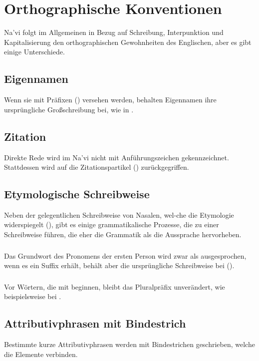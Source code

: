 \section{Orthographische Konventionen}
\noindent Na'vi folgt im Allgemeinen in Bezug auf Schreibung, Interpunktion und Kapitalisierung den orthographischen Gewohnheiten des Englischen, aber es gibt einige Unterschiede.

\subsection{Eigennamen} Wenn sie mit Präfixen () versehen werden, behalten Eigennamen ihre ursprüngliche Großschreibung bei, wie in .

\subsection{Zitation} Direkte Rede wird im Na'vi nicht mit Anführungszeichen gekennzeichnet. Stattdessen wird auf die Zitationspartikel  () zurückgegriffen.

\subsection{Etymologische Schreibweise} Neben der gelegentlichen Schreibweise von Nasalen, wel-che die Etymologie widerspiegelt (), gibt es einige grammatikalische Prozesse, die zu einer Schreibweise führen, die eher die Grammatik als die Aussprache hervorheben.

\subsubsection{} Das Grundwort des Pronomens der ersten Person  wird zwar als  ausgesprochen, wenn es ein Suffix erhält, behält aber die ursprüngliche Schreibweise bei
().

\subsubsection{} Vor Wörtern, die mit  beginnen, bleibt das Pluralpräfix  unverändert, wie beispielsweise bei .

\subsection{Attributivphrasen mit Bindestrich} Bestimmte kurze Attributivphrasen werden mit Bindestrichen geschrieben, welche die Elemente verbinden.

